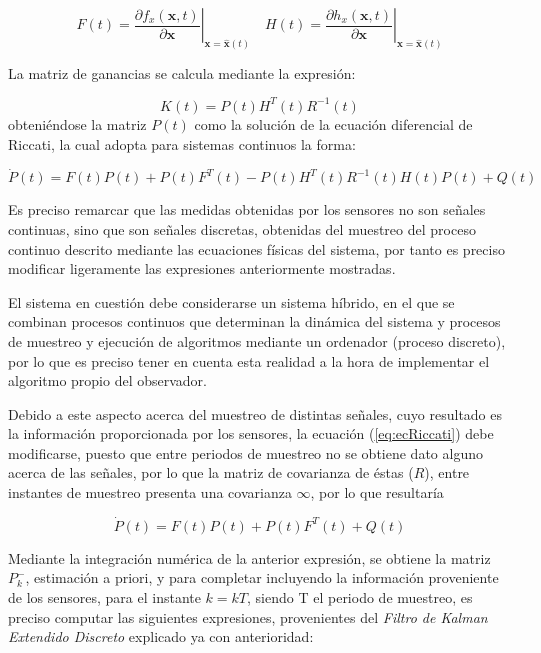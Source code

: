 \begin{equation}
	F(t) = \left.\frac{\partial f_x(\boldsymbol{x},t)}{\partial\boldsymbol{x}} \right|_{\boldsymbol{x} = \boldsymbol{\hat{x}}(t)} \quad
	H(t) = \left.\frac{\partial h_x(\boldsymbol{x},t)}{\partial\boldsymbol{x}} \right|_{\boldsymbol{x} = \boldsymbol{\hat{x}}(t)}
\end{equation}

La matriz de ganancias se calcula mediante la expresión:

\begin{equation}
	K(t) = P(t)H^T(t)R^{-1}(t)
\end{equation}
\noindent
obteniéndose la matriz $P(t)$ como la solución de la ecuación diferencial de Riccati, la cual adopta para sistemas continuos la forma:

\begin{equation}
	\dot{P}(t) = F(t)P(t) + P(t)F^T(t) - P(t)H^T(t)R^{-1}(t)H(t)P(t) + Q(t)
\label{eq:ecRiccati}
\end{equation}

Es preciso remarcar que las medidas obtenidas por los sensores no son señales continuas, sino que son señales discretas, obtenidas del muestreo del proceso continuo descrito mediante las ecuaciones físicas del sistema, por tanto es preciso modificar ligeramente las expresiones anteriormente mostradas. \par

El sistema en cuestión debe considerarse un sistema híbrido, en el que se combinan procesos continuos que determinan la dinámica del sistema y procesos de muestreo y ejecución de algoritmos mediante un ordenador (proceso discreto), por lo que es preciso tener en cuenta esta realidad a la hora de implementar el algoritmo propio del observador. \par 

Debido a este aspecto acerca del muestreo de distintas señales, cuyo resultado es la información proporcionada por los sensores, la ecuación (\ref{eq:ecRiccati}) debe modificarse, puesto que entre periodos de muestreo no se obtiene dato alguno acerca de las señales, por lo que la matriz de covarianza de éstas ($R$), entre instantes de muestreo presenta una covarianza $\infty$, por lo que resultaría

\begin{equation}
	\dot{P}(t) = F(t)P(t) + P(t)F^T(t) + Q(t)
\label{eq:ecRiccati2}
\end{equation}

Mediante la integración numérica de la anterior expresión, se obtiene la matriz $P_k^{-}$, estimación a priori, y para completar incluyendo la información proveniente de los sensores, para el instante $k = kT$, siendo T el periodo de muestreo, es preciso computar las siguientes expresiones, provenientes del \emph{Filtro de Kalman Extendido Discreto} explicado ya con anterioridad:

